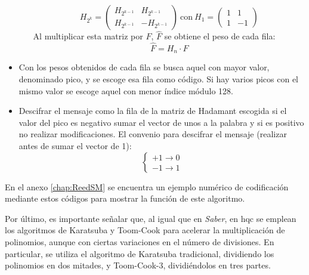 \begin{itemize}
\begin{itemize}
\begin{equation}
			 H_{2^k}=\begin{pmatrix}
				 H_{2^{k-1}} & H_{2^{k-1}}\\
				H_{2^{k-1}} & -H_{2^{k-1}}
			\end{pmatrix} \ \text{con} \ H_1=\begin{pmatrix}
				1 & 1\\
				1 & -1
			\end{pmatrix}
		\end{equation}
		Al multiplicar esta matriz por \(F\), \(\hat{F}\) se obtiene el peso de cada fila:
		\begin{equation}
			\hat{F}=H_n\cdot F
		\end{equation}
	\end{itemize}
	\item Con los pesos obtenidos de cada fila se busca aquel con mayor valor, denominado pico, y se escoge esa fila como código. Si hay varios picos con el mismo valor se escoge aquel con menor índice módulo 128.
	\item Descifrar el mensaje como la fila de la matriz de Hadamant escogida si el valor del pico es negativo sumar el vector de unos a la palabra y si es positivo no realizar modificaciones. El convenio para descifrar el mensaje (realizar antes de sumar el vector de 1):
	\begin{equation}
		\begin{cases}
			+1 \rightarrow 0\\
			-1 \rightarrow 1
		\end{cases}
	\end{equation}
\end{itemize}

En el anexo \ref{chap:ReedSM} se encuentra un ejemplo numérico de codificación mediante estos códigos para mostrar la función de este algoritmo.
\newline
 
Por último, es importante señalar que, al igual que en \textit{Saber}, en \acrshort{hqc} se emplean los algoritmos de Karatsuba y Toom-Cook para acelerar la multiplicación de polinomios, aunque con ciertas variaciones en el número de divisiones. En particular, se utiliza el algoritmo de Karatsuba tradicional, dividiendo los polinomios en dos mitades, y Toom-Cook-3, dividiéndolos en tres partes.
